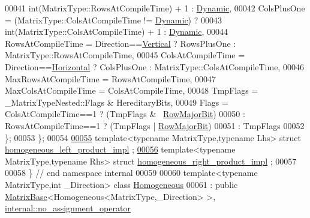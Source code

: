 \begin{DoxyCode}
00041                   \textcolor{keywordtype}{int}(MatrixType::RowsAtCompileTime) + 1 : \hyperlink{namespace_eigen_ad81fa7195215a0ce30017dfac309f0b2}{Dynamic},
00042     ColsPlusOne = (MatrixType::ColsAtCompileTime != \hyperlink{namespace_eigen_ad81fa7195215a0ce30017dfac309f0b2}{Dynamic}) ?
00043                   \textcolor{keywordtype}{int}(MatrixType::ColsAtCompileTime) + 1 : \hyperlink{namespace_eigen_ad81fa7195215a0ce30017dfac309f0b2}{Dynamic},
00044     RowsAtCompileTime = Direction==\hyperlink{group__enums_ggad49a7b3738e273eb00932271b36127f7addca718e0564723df21d61b94b1198be}{Vertical}  ?  RowsPlusOne : MatrixType::RowsAtCompileTime,
00045     ColsAtCompileTime = Direction==\hyperlink{group__enums_ggad49a7b3738e273eb00932271b36127f7aae8a16b3b9272683c1162915f6d892be}{Horizontal} ? ColsPlusOne : MatrixType::ColsAtCompileTime,
00046     MaxRowsAtCompileTime = RowsAtCompileTime,
00047     MaxColsAtCompileTime = ColsAtCompileTime,
00048     TmpFlags = \_MatrixTypeNested::Flags & HereditaryBits,
00049     Flags = ColsAtCompileTime==1 ? (TmpFlags & ~\hyperlink{group__flags_gae4f56c2a60bbe4bd2e44c5b19cbe8762}{RowMajorBit})
00050           : RowsAtCompileTime==1 ? (TmpFlags | \hyperlink{group__flags_gae4f56c2a60bbe4bd2e44c5b19cbe8762}{RowMajorBit})
00051           : TmpFlags
00052   \};
00053 \};
00054 
\hyperlink{struct_eigen_1_1internal_1_1homogeneous__left__product__impl}{00055} \textcolor{keyword}{template}<\textcolor{keyword}{typename} MatrixType,\textcolor{keyword}{typename} Lhs> \textcolor{keyword}{struct }\hyperlink{struct_eigen_1_1internal_1_1homogeneous__left__product__impl}{homogeneous\_left\_product\_impl}
      ;
\hyperlink{struct_eigen_1_1internal_1_1homogeneous__right__product__impl}{00056} \textcolor{keyword}{template}<\textcolor{keyword}{typename} MatrixType,\textcolor{keyword}{typename} Rhs> \textcolor{keyword}{struct }\hyperlink{struct_eigen_1_1internal_1_1homogeneous__right__product__impl}{homogeneous\_right\_product\_impl}
      ;
00057 
00058 \} \textcolor{comment}{// end namespace internal}
00059 
00060 \textcolor{keyword}{template}<\textcolor{keyword}{typename} MatrixType,\textcolor{keywordtype}{int} \_Direction> \textcolor{keyword}{class }\hyperlink{group___geometry___module_class_eigen_1_1_homogeneous}{Homogeneous}
00061   : \textcolor{keyword}{public} \hyperlink{group___core___module_class_eigen_1_1_matrix_base}{MatrixBase}<Homogeneous<MatrixType,\_Direction> >, 
      \hyperlink{class_eigen_1_1internal_1_1no__assignment__operator}{internal::no\_assignment\_operator}

\end{DoxyCode}
